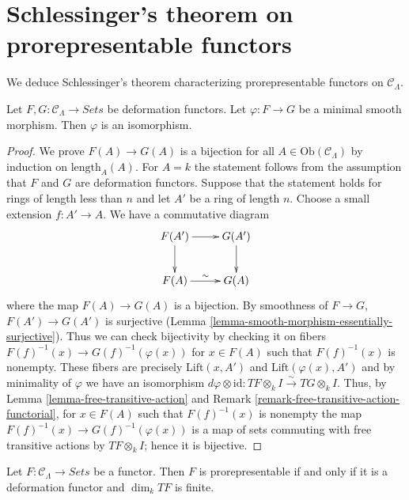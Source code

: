 \section{Schlessinger's theorem on prorepresentable functors}
\label{section-schlessingers-theorem}

\noindent
We deduce Schlessinger's theorem characterizing prorepresentable functors on 
$\mathcal{C}_\Lambda$.

\begin{lemma}
\label{lemma-minimal-smooth-morphism-functors}
Let $F,G: \mathcal{C}_\Lambda \to \textit{Sets}$ be deformation 
functors.  Let $\varphi: F \to G$ be a minimal smooth morphism. Then 
$\varphi$ is an isomorphism.
\end{lemma}

\begin{proof}
We prove $F(A) \to G(A)$ is a bijection for all $A \in 
\text{Ob}(\mathcal{C}_\Lambda)$ by induction on 
$\text{length}_{A}(A)$.  For $A = k$ the statement follows from the 
assumption that $F$ and $G$ are deformation functors. Suppose that the 
statement holds for rings of length less than $n$ and let $A'$ be a ring of 
length $n$. Choose a small extension $f: A' \to A$.  We have a 
commutative diagram
\[
\xymatrix{
F(A') \ar[r] \ar[d] & G(A') \ar[d] \\
F(A) \ar[r]^{\sim} & G(A)
}
\]
where the map $F(A) \to G(A)$ is a bijection.  By smoothness of $F 
\to G$, $F(A') \to G(A')$ is surjective (Lemma 
\ref{lemma-smooth-morphism-essentially-surjective}).  Thus we can check 
bijectivity by checking it on fibers $F(f)^{-1}(x) \to 
G(f)^{-1}(\varphi(x))$ for $x \in F(A)$ such that $F(f)^{-1}(x)$ is nonempty.  
These fibers are precisely $\text{Lift}(x,A')$ and 
$\text{Lift}(\varphi(x),A')$ and by minimality of $\varphi$ we have an 
isomorphism $d\varphi \otimes \text{id}: TF \otimes_{k} I 
\xrightarrow{\sim} TG \otimes_{k} I$.  Thus, by Lemma 
\ref{lemma-free-transitive-action} and Remark 
\ref{remark-free-transitive-action-functorial}, for $x \in F(A)$ such that 
$F(f)^{-1}(x)$ is nonempty the map $F(f)^{-1}(x) \to 
G(f)^{-1}(\varphi(x))$ is a map of sets commuting with free transitive actions 
by $TF \otimes_{k} I$; hence it is bijective.
\end{proof}

\begin{theorem}
\label{lemma-Schlessinger-prorepresentability}
Let $F: \mathcal{C}_\Lambda \to \textit{Sets}$ be a functor.  
Then $F$ is prorepresentable if and only if it is a deformation functor and 
$\dim_k TF$ is finite.
\end{theorem}

